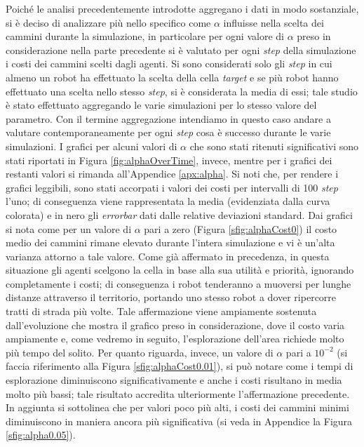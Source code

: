 Poiché le analisi precedentemente introdotte aggregano i dati in modo sostanziale, si è deciso di analizzare più nello specifico come $\alpha$ influisse nella scelta dei cammini durante la simulazione, in particolare per ogni valore di $\alpha$ preso in considerazione nella parte precedente si è valutato per ogni \textit{step} della simulazione i costi dei cammini scelti dagli agenti.
Si sono considerati solo gli \textit{step} in cui almeno un robot ha effettuato la scelta della cella \textit{target} e se più robot hanno effettuato una scelta nello stesso \textit{step}, si è considerata la media di essi; tale studio è stato effettuato aggregando le varie simulazioni per lo stesso valore del parametro. 
Con il termine aggregazione intendiamo in questo caso andare a valutare contemporaneamente per ogni \textit{step} cosa è successo durante le varie simulazioni.
I grafici per alcuni valori di $\alpha$ che sono stati ritenuti significativi sono stati riportati in Figura \ref{fig:alphaOverTime}, invece, mentre per i grafici dei restanti valori si rimanda all'Appendice \ref{apx:alpha}. Si noti che, per rendere i grafici leggibili, sono stati accorpati i valori dei costi per intervalli di 100 \textit{step} l'uno; di conseguenza viene rappresentata la media (evidenziata dalla curva colorata) e in nero gli \textit{errorbar} dati dalle relative deviazioni standard.
Dai grafici si nota come per un valore di $\alpha$ pari a zero (Figura \ref{sfig:alphaCost0}) il costo medio dei cammini rimane elevato durante l'intera simulazione e vi è un'alta varianza attorno a tale valore. Come già affermato in precedenza, in questa situazione gli agenti scelgono la cella in base alla sua utilità e priorità, ignorando completamente i costi; di conseguenza i robot tenderanno a muoversi per lunghe distanze attraverso il territorio, portando uno stesso robot a dover ripercorre tratti di strada più volte.
Tale affermazione viene ampiamente sostenuta dall'evoluzione che mostra il grafico preso in considerazione, dove il costo varia ampiamente e, come vedremo in seguito, l'esplorazione dell'area richiede molto più tempo del solito.
Per quanto riguarda, invece, un valore di $\alpha$ pari a $10^{-2}$ (si faccia riferimento alla Figura \ref{sfig:alphaCost0.01}), si può notare come i tempi di esplorazione diminuiscono significativamente e anche i costi risultano in media molto più bassi; tale risultato accredita ulteriormente l'affermazione precedente.
In aggiunta si sottolinea che per valori poco più alti, i costi dei cammini minimi diminuiscono in maniera ancora più significativa (si veda in Appendice la Figura \ref{sfig:alpha0.05}).
